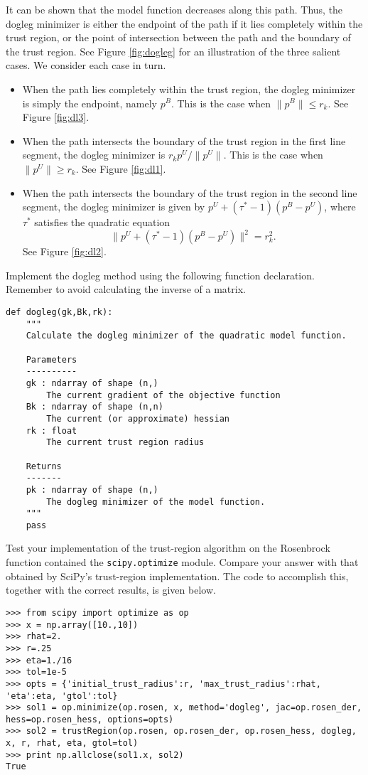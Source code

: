 It can be shown that the model function decreases along this path. Thus,
the dogleg minimizer is either the endpoint of the path if it lies completely within the trust region,
or the point of intersection between the path and the boundary of the trust region.
See Figure \ref{fig:dogleg} for an illustration of the three salient cases. We consider each case in turn.
\begin{itemize}
\item
When the path lies completely within the trust region, the dogleg minimizer is simply the endpoint, namely $p^B$.
This is the case when $\|p^B\| \leq r_k$. See Figure \ref{fig:dl3}.
\item
When the path intersects the boundary of the trust region in the first line segment, the dogleg minimizer is
$r_kp^U/\|p^U\|$.
This is the case when $\|p^U\| \geq r_k$. See Figure \ref{fig:dl1}.
\item
When the path intersects the boundary of the trust region in the second line segment, the dogleg minimizer is
given by $p^U + (\tau^*-1)(p^B-p^U)$, where $\tau^*$ satisfies the quadratic equation
\[
\|p^U + (\tau^*-1)(p^B-p^U)\|^2 = r_k^2.
\]
See Figure \ref{fig:dl2}.
\end{itemize}

\begin{problem}
Implement the dogleg method using the following function declaration.
Remember to avoid calculating the inverse of a matrix.
\begin{lstlisting}
def dogleg(gk,Bk,rk):
    """
    Calculate the dogleg minimizer of the quadratic model function.

    Parameters
    ----------
    gk : ndarray of shape (n,)
        The current gradient of the objective function
    Bk : ndarray of shape (n,n)
        The current (or approximate) hessian
    rk : float
        The current trust region radius

    Returns
    -------
    pk : ndarray of shape (n,)
        The dogleg minimizer of the model function.
    """
    pass
\end{lstlisting}

\label{prob:dogleg}
\end{problem}

Test your implementation of the trust-region algorithm on the Rosenbrock function contained the {\tt scipy.optimize} module.
Compare your answer with that obtained by SciPy's trust-region implementation. The code to accomplish this, together with the
correct results, is given below.
\begin{lstlisting}
>>> from scipy import optimize as op
>>> x = np.array([10.,10])
>>> rhat=2.
>>> r=.25
>>> eta=1./16
>>> tol=1e-5
>>> opts = {'initial_trust_radius':r, 'max_trust_radius':rhat, 'eta':eta, 'gtol':tol}
>>> sol1 = op.minimize(op.rosen, x, method='dogleg', jac=op.rosen_der, hess=op.rosen_hess, options=opts)
>>> sol2 = trustRegion(op.rosen, op.rosen_der, op.rosen_hess, dogleg, x, r, rhat, eta, gtol=tol)
>>> print np.allclose(sol1.x, sol2)
True
\end{lstlisting}


